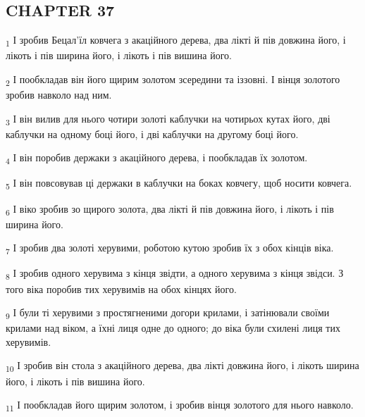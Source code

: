 \subsection{CHAPTER 37}
\begin{tcolorbox}
\textsubscript{1} І зробив Бецал'їл ковчега з акаційного дерева, два лікті й пів довжина його, і лікоть і пів ширина його, і лікоть і пів вишина його.
\end{tcolorbox}
\begin{tcolorbox}
\textsubscript{2} І пообкладав він його щирим золотом зсередини та іззовні. І вінця золотого зробив навколо над ним.
\end{tcolorbox}
\begin{tcolorbox}
\textsubscript{3} І він вилив для нього чотири золоті каблучки на чотирьох кутах його, дві каблучки на одному боці його, і дві каблучки на другому боці його.
\end{tcolorbox}
\begin{tcolorbox}
\textsubscript{4} І він поробив держаки з акаційного дерева, і пообкладав їх золотом.
\end{tcolorbox}
\begin{tcolorbox}
\textsubscript{5} І він повсовував ці держаки в каблучки на боках ковчегу, щоб носити ковчега.
\end{tcolorbox}
\begin{tcolorbox}
\textsubscript{6} І віко зробив зо щирого золота, два лікті й пів довжина його, і лікоть і пів ширина його.
\end{tcolorbox}
\begin{tcolorbox}
\textsubscript{7} І зробив два золоті херувими, роботою кутою зробив їх з обох кінців віка.
\end{tcolorbox}
\begin{tcolorbox}
\textsubscript{8} І зробив одного херувима з кінця звідти, а одного херувима з кінця звідси. З того віка поробив тих херувимів на обох кінцях його.
\end{tcolorbox}
\begin{tcolorbox}
\textsubscript{9} І були ті херувими з простягненими догори крилами, і затінювали своїми крилами над віком, а їхні лиця одне до одного; до віка були схилені лиця тих херувимів.
\end{tcolorbox}
\begin{tcolorbox}
\textsubscript{10} І зробив він стола з акаційного дерева, два лікті довжина його, і лікоть ширина його, і лікоть і пів вишина його.
\end{tcolorbox}
\begin{tcolorbox}
\textsubscript{11} І пообкладав його щирим золотом, і зробив вінця золотого для нього навколо.
\end{tcolorbox}
